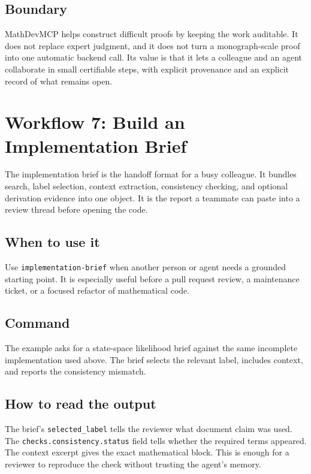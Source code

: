 \documentclass[12pt,a4paper,openany]{book}
\begin{document}
\section*{Boundary}

MathDevMCP helps construct difficult proofs by keeping the work auditable. It
does not replace expert judgment, and it does not turn a monograph-scale proof
into one automatic backend call. Its value is that it lets a colleague and an
agent collaborate in small certifiable steps, with explicit provenance and an
explicit record of what remains open.

\chapter{Workflow 7: Build an Implementation Brief}

The implementation brief is the handoff format for a busy colleague. It bundles
search, label selection, context extraction, consistency checking, and optional
derivation evidence into one object. It is the report a teammate can paste into
a review thread before opening the code.

\section*{When to use it}

Use \texttt{implementation-brief} when another person or agent needs a grounded
starting point. It is especially useful before a pull request review, a
maintenance ticket, or a focused refactor of mathematical code.

\section*{Command}

The example asks for a state-space likelihood brief against the same incomplete
implementation used above. The brief selects the relevant label, includes
context, and reports the consistency mismatch.



\section*{How to read the output}

The brief's \texttt{selected\_label} tells the reviewer what document claim was
used. The \texttt{checks.consistency.status} field tells whether the required
terms appeared. The context excerpt gives the exact mathematical block. This is
enough for a reviewer to reproduce the check without trusting the agent's
memory.
\end{document}
